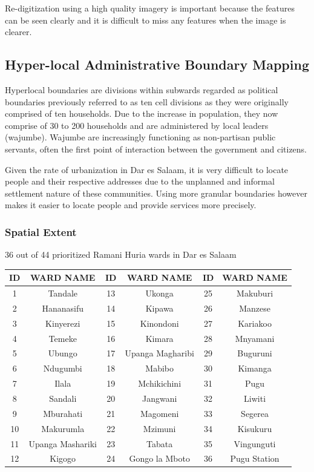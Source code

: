 \documentclass[a4paper,12pt,twoside]{article}
\begin{document}
\medskip
Re-digitization using a high quality imagery is important because the features can be seen clearly and it is difficult to miss any features when the image is clearer.

\newpage
\subsection{Hyper-local Administrative Boundary Mapping}
Hyperlocal boundaries are divisions within subwards regarded as political boundaries previously referred to as ten cell divisions as they were originally comprised of ten households.
Due to the increase in population, they now comprise of 30 to 200 households and are administered by local leaders (wajumbe). Wajumbe are increasingly functioning as non-partisan public servants, often the first point of interaction between the government and citizens.
\medskip

Given the rate of urbanization in Dar es Salaam, it is very difficult to locate people and their respective addresses due to the unplanned and informal settlement nature of these   communities. Using more granular boundaries however makes it easier to locate people and provide services more precisely.  

\subsubsection{Spatial Extent}
36 out of 44 prioritized Ramani Huria wards in Dar es Salaam

\begin{center}
\begin{tabular}{|c|c|c|c|c|c|}
\hline
ID & WARD NAME & ID & WARD NAME & ID & WARD NAME\\
\hline
1  &  Tandale &  13 &   Ukonga &  25  &  Makuburi\\
2  &  Hananasifu &  14  &  Kipawa &  26  &  Manzese\\
3  &  Kinyerezi &  15  &  Kinondoni &  27  &  Kariakoo\\
4 &  Temeke &  16  &  Kimara &  28  &  Mnyamani\\
5  &  Ubungo &  17  &  Upanga Magharibi &  29  &  Buguruni\\
6 &   Ndugumbi &  18  &  Mabibo &  30  &  Kimanga\\
7 &   Ilala &  19  &  Mchikichini &  31  &  Pugu\\
8 &   Sandali &  20  &  Jangwani &  32  &  Liwiti\\
9  &  Mburahati &  21  &  Magomeni &  33  &  Segerea\\
10  &  Makurumla &  22  &  Mzimuni &  34  &  Kisukuru\\
11  &  Upanga Mashariki &  23  &  Tabata &  35  &  Vingunguti\\
12  &  Kigogo &  24  &  Gongo la Mboto &  36  & Pugu Station\\
 \hline
\end{tabular}
\end{center}
\end{document}
